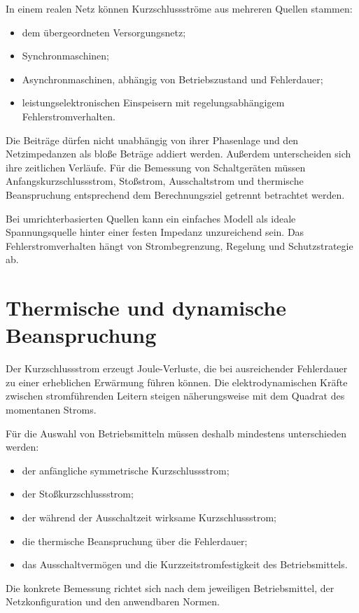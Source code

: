 In einem realen Netz können Kurzschlussströme aus mehreren Quellen stammen:
\begin{itemize}
  \item dem übergeordneten Versorgungsnetz;
  \item Synchronmaschinen;
  \item Asynchronmaschinen, abhängig von Betriebszustand und Fehlerdauer;
  \item leistungselektronischen Einspeisern mit regelungsabhängigem
        Fehlerstromverhalten.
\end{itemize}

Die Beiträge dürfen nicht unabhängig von ihrer Phasenlage und den
Netzimpedanzen als bloße Beträge addiert werden. Außerdem unterscheiden
sich ihre zeitlichen Verläufe. Für die Bemessung von Schaltgeräten müssen
Anfangskurzschlussstrom, Stoßstrom, Ausschaltstrom und thermische
Beanspruchung entsprechend dem Berechnungsziel getrennt betrachtet werden.

Bei umrichterbasierten Quellen kann ein einfaches Modell als ideale
Spannungsquelle hinter einer festen Impedanz unzureichend sein. Das
Fehlerstromverhalten hängt von Strombegrenzung, Regelung und Schutzstrategie ab.

\section{Thermische und dynamische Beanspruchung}

Der Kurzschlussstrom erzeugt Joule-Verluste, die bei ausreichender Fehlerdauer
zu einer erheblichen Erwärmung führen können. Die elektrodynamischen Kräfte
zwischen stromführenden Leitern steigen näherungsweise mit dem Quadrat
des momentanen Stroms.

Für die Auswahl von Betriebsmitteln müssen deshalb mindestens unterschieden
werden:
\begin{itemize}
  \item der anfängliche symmetrische Kurzschlussstrom;
  \item der Stoßkurzschlussstrom;
  \item der während der Ausschaltzeit wirksame Kurzschlussstrom;
  \item die thermische Beanspruchung über die Fehlerdauer;
  \item das Ausschaltvermögen und die Kurzzeitstromfestigkeit des Betriebsmittels.
\end{itemize}

Die konkrete Bemessung richtet sich nach dem jeweiligen Betriebsmittel,
der Netzkonfiguration und den anwendbaren Normen.

